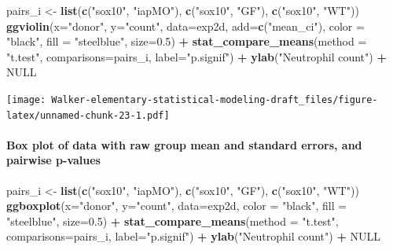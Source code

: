 \documentclass[]{book}
\newenvironment{Shaded}{\begin{snugshade}}{\end{snugshade}}
\newcommand{\KeywordTok}[1]{\textcolor[rgb]{0.13,0.29,0.53}{\textbf{#1}}}
\newcommand{\DataTypeTok}[1]{\textcolor[rgb]{0.13,0.29,0.53}{#1}}
\newcommand{\FloatTok}[1]{\textcolor[rgb]{0.00,0.00,0.81}{#1}}
\newcommand{\StringTok}[1]{\textcolor[rgb]{0.31,0.60,0.02}{#1}}
\newcommand{\OtherTok}[1]{\textcolor[rgb]{0.56,0.35,0.01}{#1}}
\newcommand{\OperatorTok}[1]{\textcolor[rgb]{0.81,0.36,0.00}{\textbf{#1}}}
\newcommand{\NormalTok}[1]{#1}
\let\oldparagraph\paragraph
\renewcommand{\paragraph}[1]{\oldparagraph{#1}\mbox{}}
\begin{document}
\begin{Shaded}
\begin{Highlighting}[]
\NormalTok{pairs_i <-}\StringTok{ }\KeywordTok{list}\NormalTok{(}\KeywordTok{c}\NormalTok{(}\StringTok{"sox10"}\NormalTok{, }\StringTok{"iapMO"}\NormalTok{), }\KeywordTok{c}\NormalTok{(}\StringTok{"sox10"}\NormalTok{, }\StringTok{"GF"}\NormalTok{), }\KeywordTok{c}\NormalTok{(}\StringTok{"sox10"}\NormalTok{, }\StringTok{"WT"}\NormalTok{))}
\KeywordTok{ggviolin}\NormalTok{(}\DataTypeTok{x=}\StringTok{"donor"}\NormalTok{, }
          \DataTypeTok{y=}\StringTok{"count"}\NormalTok{, }
          \DataTypeTok{data=}\NormalTok{exp2d,}
          \DataTypeTok{add=}\KeywordTok{c}\NormalTok{(}\StringTok{"mean_ci"}\NormalTok{),}
          \DataTypeTok{color =} \StringTok{"black"}\NormalTok{,}
          \DataTypeTok{fill =} \StringTok{"steelblue"}\NormalTok{,}
          \DataTypeTok{size=}\FloatTok{0.5}\NormalTok{) }\OperatorTok{+}
\StringTok{  }\KeywordTok{stat_compare_means}\NormalTok{(}\DataTypeTok{method =} \StringTok{"t.test"}\NormalTok{, }\DataTypeTok{comparisons=}\NormalTok{pairs_i, }\DataTypeTok{label=}\StringTok{"p.signif"}\NormalTok{) }\OperatorTok{+}
\StringTok{  }\KeywordTok{ylab}\NormalTok{(}\StringTok{"Neutrophil count"}\NormalTok{) }\OperatorTok{+}
\StringTok{  }\OtherTok{NULL}
\end{Highlighting}
\end{Shaded}

\texttt{[image: Walker-elementary-statistical-modeling-draft\_files/figure-latex/unnamed-chunk-23-1.pdf]}

\paragraph{Box plot of data with raw group mean and standard errors, and
pairwise
p-values}\label{box-plot-of-data-with-raw-group-mean-and-standard-errors-and-pairwise-p-values}

\begin{Shaded}
\begin{Highlighting}[]
\NormalTok{pairs_i <-}\StringTok{ }\KeywordTok{list}\NormalTok{(}\KeywordTok{c}\NormalTok{(}\StringTok{"sox10"}\NormalTok{, }\StringTok{"iapMO"}\NormalTok{), }\KeywordTok{c}\NormalTok{(}\StringTok{"sox10"}\NormalTok{, }\StringTok{"GF"}\NormalTok{), }\KeywordTok{c}\NormalTok{(}\StringTok{"sox10"}\NormalTok{, }\StringTok{"WT"}\NormalTok{))}
\KeywordTok{ggboxplot}\NormalTok{(}\DataTypeTok{x=}\StringTok{"donor"}\NormalTok{, }
          \DataTypeTok{y=}\StringTok{"count"}\NormalTok{, }
          \DataTypeTok{data=}\NormalTok{exp2d,}
          \DataTypeTok{color =} \StringTok{"black"}\NormalTok{,}
          \DataTypeTok{fill =} \StringTok{"steelblue"}\NormalTok{,}
          \DataTypeTok{size=}\FloatTok{0.5}\NormalTok{) }\OperatorTok{+}
\StringTok{  }\KeywordTok{stat_compare_means}\NormalTok{(}\DataTypeTok{method =} \StringTok{"t.test"}\NormalTok{, }\DataTypeTok{comparisons=}\NormalTok{pairs_i, }\DataTypeTok{label=}\StringTok{"p.signif"}\NormalTok{) }\OperatorTok{+}
\StringTok{  }\KeywordTok{ylab}\NormalTok{(}\StringTok{"Neutrophil count"}\NormalTok{) }\OperatorTok{+}
\StringTok{  }\OtherTok{NULL}
\end{Highlighting}
\end{Shaded}
\end{document}
